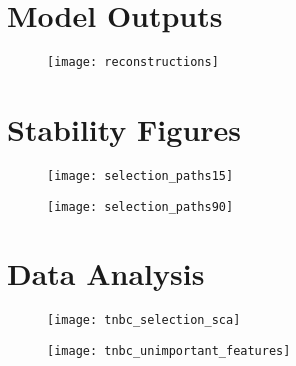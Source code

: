 \section{Model Outputs}

\begin{figure}
\texttt{[image: reconstructions]}
\caption{}
\label{fig:reconstructions}
\end{figure}

\section{Stability Figures}

\begin{figure}
  \centering
  \texttt{[image: selection\_paths15]}
  \caption{}
  \label{fig:}
\end{figure}


\begin{figure}
  \centering
  \texttt{[image: selection\_paths90]}
  \caption{}
  \label{fig:}
\end{figure}

\section{Data Analysis}

\begin{figure}
  \centering
  \texttt{[image: tnbc\_selection\_sca]}
\end{figure}


\begin{figure}
  \centering
  \texttt{[image: tnbc\_unimportant\_features]}
\end{figure}
